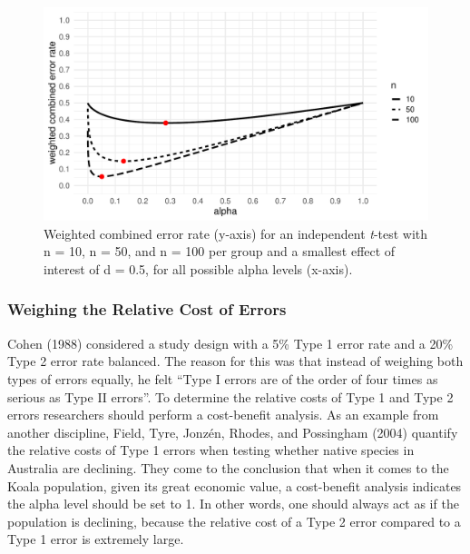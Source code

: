 \documentclass[,jou,floatsintext]{apa6}
\begin{document}
\begin{figure}
\centering
\includegraphics{Justify_in_Practice_files/figure-latex/weight-plot-1.pdf}
\caption{\label{fig:weight-plot}Weighted combined error rate (y-axis) for an independent \emph{t}-test with n = 10, n = 50, and n = 100 per group and a smallest effect of interest of d = 0.5, for all possible alpha levels (x-axis).}
\end{figure}

\hypertarget{weighing-the-relative-cost-of-errors}{%
\subsubsection{Weighing the Relative Cost of Errors}\label{weighing-the-relative-cost-of-errors}}

Cohen (1988) considered a study design with a 5\% Type 1 error rate and a 20\% Type 2 error rate balanced. The reason for this was that instead of weighing both types of errors equally, he felt \enquote{Type I errors are of the order of four times as serious as Type II errors}. To determine the relative costs of Type 1 and Type 2 errors researchers should perform a cost-benefit analysis. As an example from another discipline, Field, Tyre, Jonzén, Rhodes, and Possingham (2004) quantify the relative costs of Type 1 errors when testing whether native species in Australia are declining. They come to the conclusion that when it comes to the Koala population, given its great economic value, a cost-benefit analysis indicates the alpha level should be set to 1. In other words, one should always act as if the population is declining, because the relative cost of a Type 2 error compared to a Type 1 error is extremely large.
\end{document}
